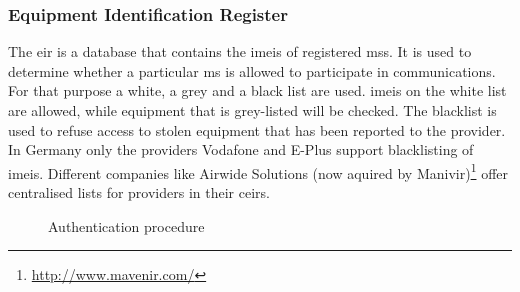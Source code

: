 \subsubsection{Equipment Identification Register}
The \gls{eir} is a database that contains the \glspl{imei} of registered \glspl{ms}.
It is used to determine whether a particular \gls{ms} is allowed to participate in communications.
For that purpose a white, a grey and a black list are used.
\glspl{imei} on the white list are allowed, while equipment that is grey-listed will be checked.
The blacklist is used to refuse access to \eg stolen equipment that has been reported to the provider.
In Germany only the providers Vodafone and E-Plus support blacklisting of \glspl{imei}\cite{blacklisting}.
Different companies like Airwide Solutions (now aquired by Manivir)\footnote{\url{http://www.mavenir.com/}} offer centralised lists for providers in their \glspl{ceir}.

\begin{figure}
\centering
\caption{Authentication procedure}
\label{fig:authentication}
\end{figure}
